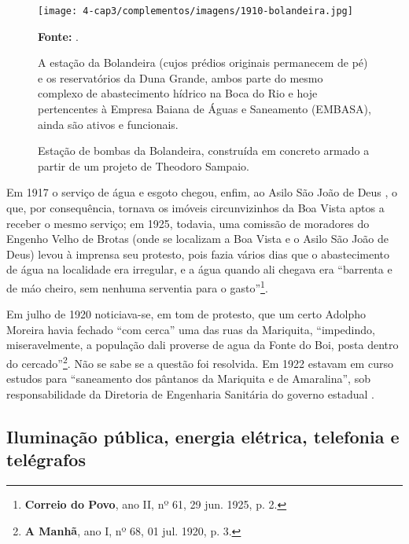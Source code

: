 \begin{figure}[!htp]
\centering
\caption{Estação de bombas da Bolandeira, construída em concreto armado a partir de um projeto de Theodoro Sampaio.}
\texttt{[image: 4-cap3/complementos/imagens/1910-bolandeira.jpg]}{\par \footnotesize \textbf{Fonte:} . \par A estação da Bolandeira (cujos prédios originais permanecem de pé) e os reservatórios da Duna Grande, ambos parte do mesmo complexo de abastecimento hídrico na Boca do Rio e hoje pertencentes à Empresa Baiana de Águas e Saneamento (EMBASA), ainda são ativos e funcionais.}
\label{fig:bolandeira}
\end{figure}

Em 1917 o serviço de água e esgoto chegou, enfim, ao Asilo São João de Deus \cite[p.~63]{bahia_rpe_1914}, o que, por consequência, tornava os imóveis circunvizinhos da Boa Vista aptos a receber o mesmo serviço; em 1925, todavia, uma comissão de moradores do Engenho Velho de Brotas (onde se localizam a Boa Vista e o Asilo São João de Deus) levou à imprensa seu protesto, pois fazia vários dias que o abastecimento de água na localidade era irregular, e a água quando ali chegava era ``barrenta e de máo cheiro, sem nenhuma serventia para o gasto''\footnote{\textbf{Correio do Povo}, ano II, nº 61, 29 jun. 1925, p. 2.}.

Em julho de 1920 noticiava-se, em tom de protesto, que um certo Adolpho Moreira havia fechado ``com cerca'' uma das ruas da Mariquita, ``impedindo, miseravelmente, a população dali proverse de agua da Fonte do Boi, posta dentro do cercado''\footnote{\textbf{A Manhã}, ano I, nº 68, 01 jul. 1920, p. 3.}. Não se sabe se a questão foi resolvida. Em 1922 estavam em curso estudos para ``saneamento dos pântanos da Mariquita e de Amaralina'', sob responsabilidade da Diretoria de Engenharia Sanitária do governo estadual \cite[p.~409]{bahia_rpe_1922}.

\subsection{Iluminação pública, energia elétrica, telefonia e telégrafos}

